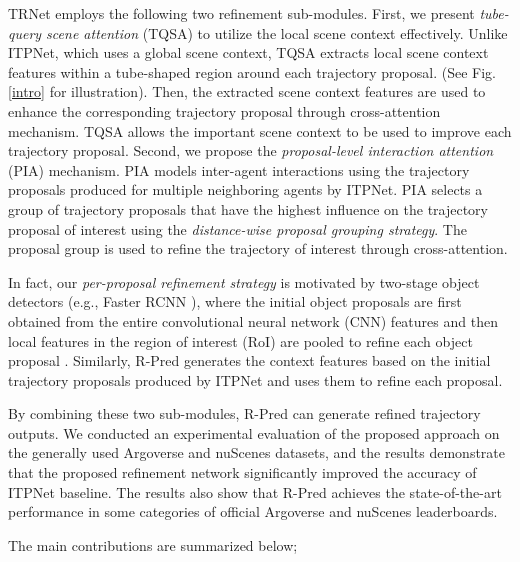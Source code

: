 \documentclass[10pt,twocolumn,letterpaper]{article}
\begin{document}
TRNet employs the following two refinement sub-modules.  First, we present {\it tube-query scene attention} (TQSA) to utilize the local scene context effectively. Unlike ITPNet, which uses a global scene context, TQSA extracts local scene context features within a tube-shaped region around each trajectory proposal. (See Fig. \ref{intro} for illustration). 
Then, the extracted scene context features are used to enhance the corresponding trajectory proposal through cross-attention mechanism. TQSA allows the important scene context to be used to improve each  trajectory proposal.  
Second, we propose the {\it proposal-level interaction attention} (PIA) mechanism.  PIA  models inter-agent interactions using the trajectory proposals produced for multiple neighboring agents by ITPNet. PIA selects a group of trajectory proposals that have the highest influence on the trajectory proposal of interest using the {\it distance-wise proposal grouping strategy}. The proposal group is used to refine the trajectory of interest through cross-attention. 




In fact, our {\it per-proposal refinement strategy} is motivated by  two-stage object detectors (e.g., Faster RCNN \cite{Faster}), where the initial object proposals are first obtained from the entire convolutional neural network (CNN) features and then local features in the region of interest (RoI) are pooled to refine each object proposal \cite{Fast, Faster, Mask}. Similarly, R-Pred generates the context features based on the initial trajectory proposals produced by ITPNet and uses them to refine each proposal.







By combining these two sub-modules, R-Pred can  generate  refined trajectory outputs. We conducted an experimental evaluation of the proposed approach on the generally used Argoverse \cite{Argoverse} and nuScenes \cite{nuScenes} datasets, and the results demonstrate that the proposed refinement network significantly improved the accuracy of ITPNet baseline.
The results also show that R-Pred achieves the state-of-the-art performance in some categories of official Argoverse and nuScenes leaderboards.

The main contributions are summarized below;
\end{document}
